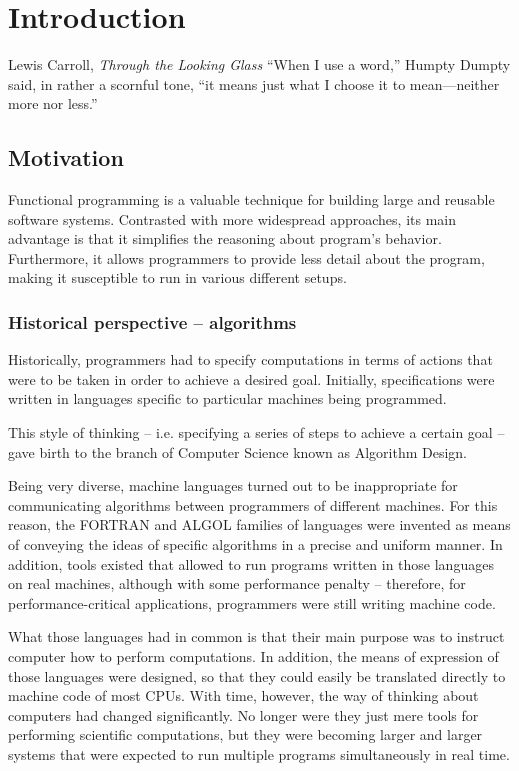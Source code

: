 \chapter{Introduction}

\begin{chapquote}{Lewis Carroll, \textit{Through the Looking Glass}}
  “When I use a word,” Humpty Dumpty said, in rather a scornful tone,
  “it means just what I choose it to mean—neither more nor less.”
\end{chapquote}

\section{Motivation}

Functional programming is a valuable technique for building large
and reusable software systems. Contrasted with more widespread
approaches, its main advantage is that it simplifies the reasoning
about program's behavior. Furthermore, it allows programmers to
provide less detail about the program, making it susceptible to run
in various different setups.

\subsection{Historical perspective -- algorithms}

Historically, programmers had to specify computations in terms
of actions that were to be taken in order to achieve a desired goal.
Initially, specifications were written in languages specific to
particular machines being programmed.

This style of thinking -- i.e. specifying a series of steps to
achieve a certain goal -- gave birth to the branch of Computer
Science known as Algorithm Design.

Being very diverse, machine languages turned out to be inappropriate for
communicating algorithms between programmers of different machines.
For this reason, the FORTRAN and ALGOL families of languages were invented
as means of conveying the ideas of specific algorithms in a precise
and uniform manner\cite{Sebesta2008}. In addition, tools existed that allowed
to run programs written in those languages on real machines, although with
some performance penalty -- therefore, for performance-critical applications,
programmers were still writing machine code\cite{Victor2013}.

What those languages had in common is that their main purpose was
to instruct computer how to perform computations. In addition,
the means of expression of those languages were designed, so that
they could easily be translated directly to machine code of most CPUs.
With time, however, the way of thinking about computers had changed
significantly. No longer were they just mere tools for performing
scientific computations, but they were becoming larger and larger
systems that were expected to run multiple programs simultaneously
in real time.

